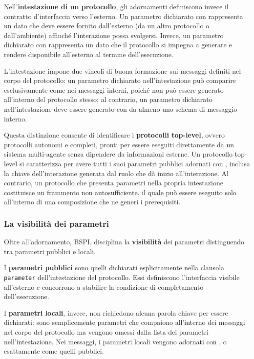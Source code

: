 Nell'\textbf{intestazione di un protocollo}, gli adornamenti definiscono invece il contratto 
d'interfaccia verso l'esterno. Un parametro dichiarato con  rappresenta 
un dato che deve essere fornito dall'esterno (da un altro protocollo o dall'ambiente) affinché 
l'interazione possa svolgersi.
Invece, un parametro dichiarato con  rappresenta un dato che il protocollo
si impegna a generare e rendere disponibile all'esterno al termine dell'esecuzione.

L'intestazione impone due vincoli di buona formazione sui messaggi definiti nel corpo del protocollo:
un parametro dichiarato  nell'intestazione può comparire esclusivamente 
come  nei messaggi interni, poiché non può essere generato all'interno 
del protocollo stesso; al contrario, un parametro dichiarato  nell'intestazione 
deve essere generato con  da almeno uno schema di messaggio interno.

Questa distinzione consente di identificare i \textbf{protocolli top-level}, ovvero protocolli 
autonomi e completi, pronti per essere eseguiti direttamente da un sistema multi-agente senza 
dipendere da informazioni esterne. Un protocollo top-level si caratterizza per avere tutti i 
suoi parametri pubblici adornati con , inclusa la chiave dell'interazione 
generata dal ruolo che dà inizio all'interazione. Al contrario, un protocollo che presenta 
parametri  nella propria intestazione costituisce un frammento non 
autosufficiente, il quale può essere eseguito solo all'interno di una composizione che ne 
generi i prerequisiti.

\subsubsection{La visibilità dei parametri}\label{bspl:visibilita}

Oltre all'adornamento, BSPL disciplina la \textbf{visibilità} dei parametri distinguendo tra
parametri pubblici e locali.

I \textbf{parametri pubblici} sono quelli dichiarati esplicitamente nella clausola \texttt{parameter} 
dell'intestazione del protocollo. Essi definiscono l'interfaccia visibile all'esterno e concorrono 
a stabilire la condizione di completamento dell'esecuzione.

I \textbf{parametri locali}, invece, non richiedono alcuna parola chiave per essere dichiarati: sono 
semplicemente parametri che compaiono all'interno dei messaggi nel corpo del protocollo ma vengono 
omessi dalla lista dei parametri nell'intestazione. Nei messaggi, i parametri locali vengono 
adornati con ,  o  
esattamente come quelli pubblici.

